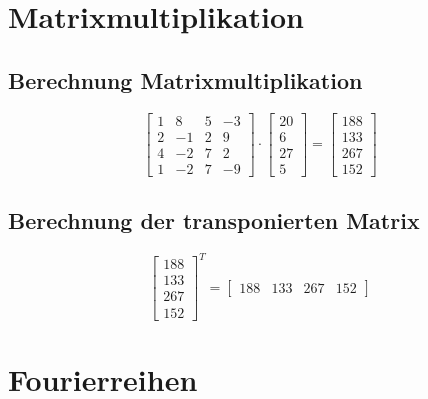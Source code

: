 \documentclass[a4paper, 12pt]{article}
\begin{document}
\section{Matrixmultiplikation}

\subsection{Berechnung Matrixmultiplikation}

\begin{equation*}
    \begin{bmatrix}
        1 & 8 & 5 & -3 \\
        2 & -1 & 2 & 9 \\
        4 & -2 & 7 & 2 \\
        1 & -2 & 7 & -9
    \end{bmatrix}
    \cdot
    \begin{bmatrix}
        20 \\
        6 \\
        27 \\
        5
    \end{bmatrix}
    =
    \begin{bmatrix}
        188 \\
        133 \\
        267 \\
        152
    \end{bmatrix}
\end{equation*}

\subsection{Berechnung der transponierten Matrix}

\begin{equation*}
    \begin{bmatrix}
        188 \\ 133 \\ 267 \\ 152
    \end{bmatrix}^T
    =
    \begin{bmatrix}
        188 & 133 & 267 & 152
    \end{bmatrix}
\end{equation*}

\section{Fourierreihen}
\end{document}
